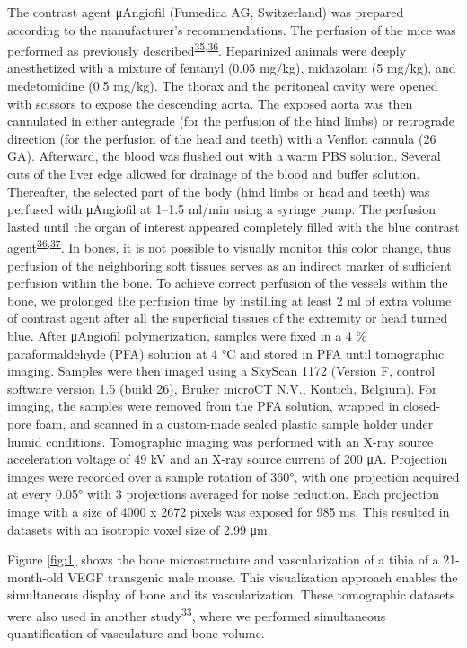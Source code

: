 The contrast agent μAngiofil (Fumedica AG, Switzerland) was prepared according to the manufacturer's recommendations.
The perfusion of the mice was performed as previously described\textsuperscript{\protect\hyperlink{ref-s9aC9H1e}{35},\protect\hyperlink{ref-ijqzbOI6}{36}}.
Heparinized animals were deeply anesthetized with a mixture of fentanyl (0.05 mg/kg), midazolam (5 mg/kg), and medetomidine (0.5 mg/kg).
The thorax and the peritoneal cavity were opened with scissors to expose the descending aorta.
The exposed aorta was then cannulated in either antegrade (for the perfusion of the hind limbs) or retrograde direction (for the perfusion of the head and teeth) with a Venflon cannula (26 GA).
Afterward, the blood was flushed out with a warm PBS solution.
Several cuts of the liver edge allowed for drainage of the blood and buffer solution.
Thereafter, the selected part of the body (hind limbs or head and teeth) was perfused with μAngiofil at 1--1.5 ml/min using a syringe pump.
The perfusion lasted until the organ of interest appeared completely filled with the blue contrast agent\textsuperscript{\protect\hyperlink{ref-ijqzbOI6}{36},\protect\hyperlink{ref-TYAmre95}{37}}.
In bones, it is not possible to visually monitor this color change, thus perfusion of the neighboring soft tissues serves as an indirect marker of sufficient perfusion within the bone.
To achieve correct perfusion of the vessels within the bone, we prolonged the perfusion time by instilling at least 2 ml of extra volume of contrast agent after all the superficial tissues of the extremity or head turned blue.
After μAngiofil polymerization, samples were fixed in a 4 \% paraformaldehyde (PFA) solution at 4 °C and stored in PFA until tomographic imaging.
Samples were then imaged using a SkyScan 1172 (Version F, control software version 1.5 (build 26), Bruker microCT N.V., Kontich, Belgium).
For imaging, the samples were removed from the PFA solution, wrapped in closed-pore foam, and scanned in a custom-made sealed plastic sample holder under humid conditions.
Tomographic imaging was performed with an X-ray source acceleration voltage of 49 kV and an X-ray source current of 200 μA.
Projection images were recorded over a sample rotation of 360°, with one projection acquired at every 0.05° with 3 projections averaged for noise reduction.
Each projection image with a size of 4000 x 2672 pixels was exposed for 985 ms.
This resulted in datasets with an isotropic voxel size of 2.99 μm.

Figure \ref{fig:1} shows the bone microstructure and vascularization of a tibia of a 21-month-old VEGF transgenic male mouse.
This visualization approach enables the simultaneous display of bone and its vascularization.
These tomographic datasets were also used in another study\textsuperscript{\protect\hyperlink{ref-nC0ZZVgL}{33}}, where we performed simultaneous quantification of vasculature and bone volume.

